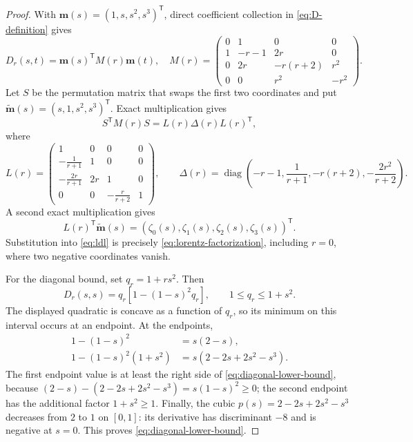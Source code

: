 \documentclass[11pt]{article}
\theoremstyle{plain}
\theoremstyle{definition}
\theoremstyle{remark}
\begin{document}
\begin{proof}
With \(\boldsymbol m(s)=(1,s,s^2,s^3)^{\mathsf T}\), direct coefficient
collection in \eqref{eq:D-definition} gives
\begin{equation}
  D_r(s,t)=\boldsymbol m(s)^{\mathsf T}M(r)\boldsymbol m(t),
  \quad
  M(r)=
  \begin{pmatrix}
    0&1&0&0\\
    1&-r-1&2r&0\\
    0&2r&-r(r+2)&r^2\\
    0&0&r^2&-r^2
  \end{pmatrix}.
  \label{eq:coefficient-matrix}
\end{equation}
Let \(S\) be the permutation matrix that swaps the first two coordinates and
put \(\widetilde{\boldsymbol m}(s)=(s,1,s^2,s^3)^{\mathsf T}\).  Exact
multiplication gives
\begin{equation}
  S^{\mathsf T}M(r)S=L(r)\Delta(r)L(r)^{\mathsf T},
  \label{eq:ldl}
\end{equation}
where
\[
  L(r)=
  \begin{pmatrix}
    1&0&0&0\\
    -\frac1{r+1}&1&0&0\\
    -\frac{2r}{r+1}&2r&1&0\\
    0&0&-\frac r{r+2}&1
  \end{pmatrix},
  \qquad
  \Delta(r)=\operatorname{diag}\left(
    -r-1,\frac1{r+1},-r(r+2),-\frac{2r^2}{r+2}
  \right).
\]
A second exact multiplication gives
\[
  L(r)^{\mathsf T}\widetilde{\boldsymbol m}(s)
  =(\zeta_0(s),\zeta_1(s),\zeta_2(s),\zeta_3(s))^{\mathsf T}.
\]
Substitution into \eqref{eq:ldl} is precisely
\eqref{eq:lorentz-factorization}, including \(r=0\), where two negative
coordinates vanish.

For the diagonal bound, set \(q_r=1+rs^2\).  Then
\[
  D_r(s,s)=q_r[1-(1-s)^2q_r],\qquad 1\le q_r\le1+s^2.
\]
The displayed quadratic is concave as a function of \(q_r\), so its minimum
on this interval occurs at an endpoint.  At the endpoints,
\begin{align*}
  1-(1-s)^2&=s(2-s),\\
  1-(1-s)^2(1+s^2)&=s(2-2s+2s^2-s^3).
\end{align*}
The first endpoint value is at least the right side of
\eqref{eq:diagonal-lower-bound}, because
\((2-s)-(2-2s+2s^2-s^3)=s(1-s)^2\ge0\); the second endpoint has the additional
factor \(1+s^2\ge1\).  Finally, the cubic
\(p(s)=2-2s+2s^2-s^3\) decreases from \(2\) to \(1\) on \([0,1]\): its
derivative has discriminant \(-8\) and is negative at \(s=0\).  This proves
\eqref{eq:diagonal-lower-bound}.
\end{proof}
\end{document}
